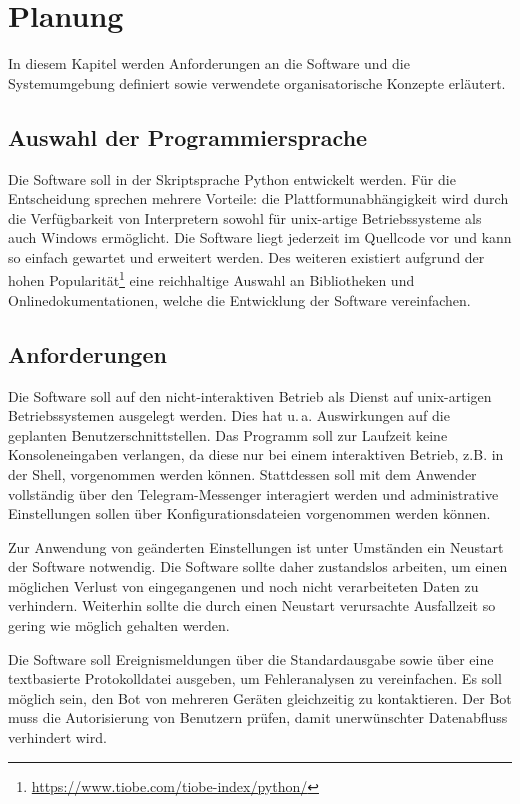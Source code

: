 \chapter{Planung}
\label{cha:planung}

In diesem Kapitel werden Anforderungen an die Software und die Systemumgebung definiert sowie verwendete organisatorische Konzepte erläutert.

\section{Auswahl der Programmiersprache}

Die Software soll in der Skriptsprache Python entwickelt werden. Für die Entscheidung sprechen mehrere Vorteile: die Plattformunabhängigkeit wird durch die Verfügbarkeit von Interpretern sowohl für unix-artige Betriebssysteme als auch Windows ermöglicht. Die Software liegt jederzeit im Quellcode vor und kann so einfach gewartet und erweitert werden. Des weiteren existiert aufgrund der hohen Popularität\footnote{\url{https://www.tiobe.com/tiobe-index/python/}} eine reichhaltige Auswahl an Bibliotheken und Onlinedokumentationen, welche die Entwicklung der Software vereinfachen. 

\section{Anforderungen}

Die Software soll auf den nicht-interaktiven Betrieb als Dienst auf unix-artigen Betriebssystemen ausgelegt werden. Dies hat u.\,a. Auswirkungen auf die geplanten Benutzerschnittstellen. Das Programm soll zur Laufzeit keine Konsoleneingaben verlangen, da diese nur bei einem interaktiven Betrieb, z.B. in der Shell, vorgenommen werden können. Stattdessen soll mit dem Anwender vollständig über den Telegram-Messenger interagiert werden und administrative Einstellungen sollen über Konfigurationsdateien vorgenommen werden können. 

Zur Anwendung von geänderten Einstellungen ist unter Umständen ein Neustart der Software notwendig. Die Software sollte daher zustandslos arbeiten, um einen möglichen Verlust von eingegangenen und noch nicht verarbeiteten Daten zu verhindern. Weiterhin sollte die durch einen Neustart verursachte Ausfallzeit so gering wie möglich gehalten werden. 

Die Software soll Ereignismeldungen über die Standardausgabe sowie über eine textbasierte Protokolldatei ausgeben, um Fehleranalysen zu vereinfachen. Es soll möglich sein, den Bot von mehreren Geräten gleichzeitig zu kontaktieren. Der Bot muss die Autorisierung von Benutzern prüfen, damit unerwünschter Datenabfluss verhindert wird.

